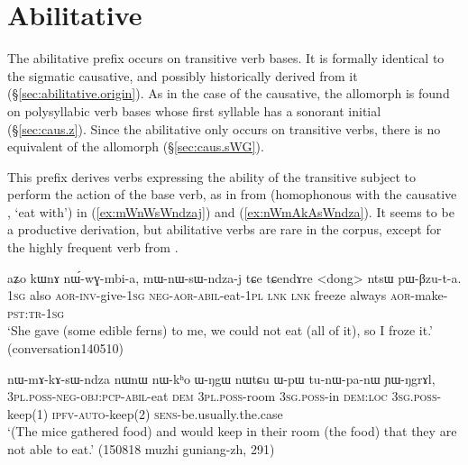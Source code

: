 \section{Abilitative} \label{sec:abilitative} 
The abilitative  prefix occurs on transitive verb bases. It is formally identical to the sigmatic causative, and possibly historically derived from it (§\ref{sec:abilitative.origin}).  As in the case of the causative, the allomorph  is found on polysyllabic verb bases whose first syllable has a sonorant initial (§\ref{sec:caus.z}). Since the abilitative only occurs on transitive verbs, there is no equivalent of the  allomorph (§\ref{sec:caus.sWG}).

This prefix derives verbs expressing the ability of the transitive subject to perform the action of the base verb, as in  from  (homophonous with the causative , `eat with') in (\ref{ex:mWnWsWndzaj}) and (\ref{ex:nWmAkAsWndza}). It seems to be a productive derivation, but abilitative verbs are rare in the corpus, except for the highly frequent verb  from .

\begin{exe}
\ex \label{ex:mWnWsWndzaj}
\gll aʑo kɯnɤ nɯ́-wɣ-mbi-a, mɯ-nɯ-sɯ-ndza-j tɕe tɕendɤre <dong> ntsɯ pɯ-βzu-t-a. \\
\textsc{1sg} also \textsc{aor}-\textsc{inv}-give-\textsc{1sg}  \textsc{neg}-\textsc{aor}-\textsc{abil}-eat-\textsc{1pl} \textsc{lnk} \textsc{lnk} freeze always \textsc{aor}-make-\textsc{pst}:\textsc{tr}-\textsc{1sg} \\
\glt `She gave (some edible ferns) to me, we could not eat (all of it), so I froze it.' (conversation140510)
\end{exe}

\begin{exe}
\ex \label{ex:nWmAkAsWndza}
\gll nɯ-mɤ-kɤ-sɯ-ndza nɯnɯ nɯ-kʰo ɯ-ŋgɯ nɯtɕu ɯ-pɯ tu-nɯ-pa-nɯ ɲɯ-ŋgrɤl, \\
\textsc{3pl}.\textsc{poss}-\textsc{neg}-\textsc{obj}:\textsc{pcp}-\textsc{abil}-eat \textsc{dem} \textsc{3pl}.\textsc{poss}-room \textsc{3sg}.\textsc{poss}-in \textsc{dem}:\textsc{loc} \textsc{3sg}.\textsc{poss}-keep(1) \textsc{ipfv}-\textsc{auto}-keep(2) \textsc{sens}-be.usually.the.case \\
\glt `(The mice gathered food) and would keep in their room (the food) that they are not able to eat.' (150818 muzhi guniang-zh, 291)
\end{exe}

